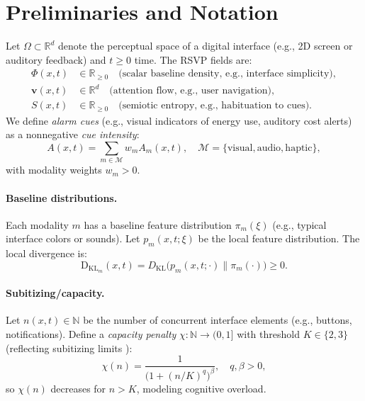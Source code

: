 \documentclass[openany]{book}
\newcommand{\PhiS}{\Phi} %
\newcommand{\vvec}{\mathbf{v}} %
\newcommand{\Sent}{S} %
\newcommand{\KL}{\mathrm{D}_{\mathrm{KL}}}
\begin{document}
\section{Preliminaries and Notation}
\label{sec:rsvp-prelim}
Let $\Omega \subset \mathbb{R}^d$ denote the perceptual space of a digital interface (e.g., 2D screen or auditory feedback) and $t \geq 0$ time. The RSVP fields are:
\begin{align*}
\PhiS(x,t) &\in \mathbb{R}_{\geq 0} \quad \text{(scalar baseline density, e.g., interface simplicity)}, \\
\vvec(x,t) &\in \mathbb{R}^d \quad \text{(attention flow, e.g., user navigation)}, \\
\Sent(x,t) &\in \mathbb{R}_{\geq 0} \quad \text{(semiotic entropy, e.g., habituation to cues)}.
\end{align*}
We define \emph{alarm cues} (e.g., visual indicators of energy use, auditory cost alerts) as a nonnegative \emph{cue intensity}:
\begin{equation}
A(x,t) = \sum_{m \in \mathcal{M}} w_m A_m(x,t), \quad \mathcal{M} = \{\text{visual}, \text{audio}, \text{haptic}\},
\end{equation}
with modality weights $w_m > 0$.

\paragraph{Baseline distributions.}
Each modality $m$ has a baseline feature distribution $\pi_m(\xi)$ (e.g., typical interface colors or sounds). Let $p_m(x,t;\xi)$ be the local feature distribution. The local divergence is:
\begin{equation}
\label{eq:KL}
\KL_{m}(x,t) = D_{\mathrm{KL}}\big(p_m(x,t;\cdot) \|\pi_m(\cdot)\big) \geq 0.
\end{equation}

\paragraph{Subitizing/capacity.}
Let $n(x,t) \in \mathbb{N}$ be the number of concurrent interface elements (e.g., buttons, notifications). Define a \emph{capacity penalty} $\chi: \mathbb{N} \to (0,1]$ with threshold $K \in \{2,3\}$ (reflecting subitizing limits \citep{kaufman1949}):
\begin{equation}
\label{eq:capacity}
\chi(n) = \frac{1}{\big(1 + (n/K)^q\big)^{\beta}}, \quad q, \beta > 0,
\end{equation}
so $\chi(n)$ decreases for $n > K$, modeling cognitive overload.
\end{document}

